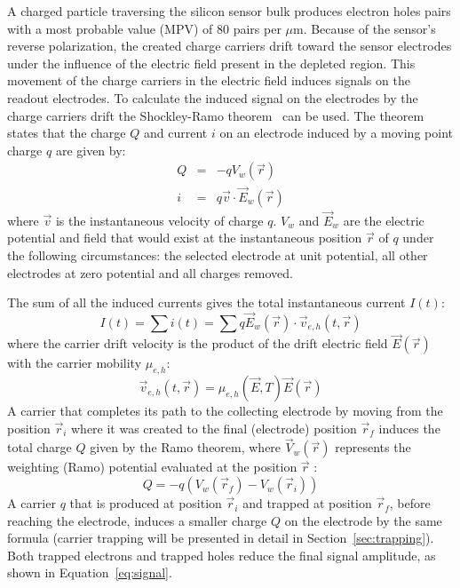 A charged particle traversing the silicon sensor bulk produces electron holes pairs with a most 
probable value (MPV) of 80 pairs per $\mu$m. Because of the sensor's reverse
polarization, the created charge carriers drift toward the sensor electrodes under the influence of
the electric field present in the depleted region. This movement of the charge carriers in the electric 
field induces signals on the readout electrodes.
To calculate the induced signal on the electrodes by the charge carriers drift the Shockley-Ramo 
theorem~\cite{ShockleyPot,Ramo,HE2001250} can be used.
The theorem states that the charge $Q$ and current $i$ on an electrode induced by a moving point 
charge $q$ are given by:
\begin{eqnarray}
Q &=&-qV_{w}(\vec{r})\\ 
i &=&q\vec{v}\cdot\vec{E}_{w}(\vec{r}) 
\end{eqnarray}
where $\vec{v}$ is the instantaneous velocity of charge $q$. $V_{w}$ and $\vec{E}_{w}$ are the 
electric potential and field that would exist at the instantaneous position $\vec{r}$ of $q$ under the 
following circumstances: the selected electrode at unit potential, all other electrodes at zero potential 
and all charges removed.

The sum of all the induced currents gives the total instantaneous current $I(t)$:
\begin{equation}
I(t) = \sum i(t)=\sum q\vec{E}_w(\vec{r})\cdot\vec{v}_{e,h}(t,\vec{r})
\label{eq:current}
\end{equation}
where the carrier drift velocity is the product of the drift electric field $\vec{E}(\vec{r})$ with the carrier mobility $\mu_{e,h}$:
\begin{equation}
\vec{v}_{e,h}(t,\vec{r})=\mu_{e,h}(\vec{E},T)\vec{E}(\vec{r})
\label{eq:carrierV}
\end{equation}
A carrier that completes its path to the collecting electrode by moving from the position $\vec{r}_i$ where it was created to the
final (electrode) position $\vec{r}_f$ induces the total charge $Q$ given by the Ramo theorem, where $\vec{V}_w(\vec{r})$ represents the weighting (Ramo) potential evaluated at the position $\vec{r}$ :
\begin{equation}
Q = - q\left(V_w(\vec{r}_f)-V_w(\vec{r}_i)\right)
\label{eq:signal}
\end{equation}
A carrier $q$ that is produced at position $\vec{r}_i$ and trapped at position $\vec{r}_f$, before 
reaching the electrode, induces a smaller charge $Q$ on the electrode by the same formula 
(carrier trapping will be presented in detail in Section~\ref{sec:trapping}). Both 
trapped electrons and trapped holes reduce the final signal amplitude, as shown in 
Equation~\ref{eq:signal}.

